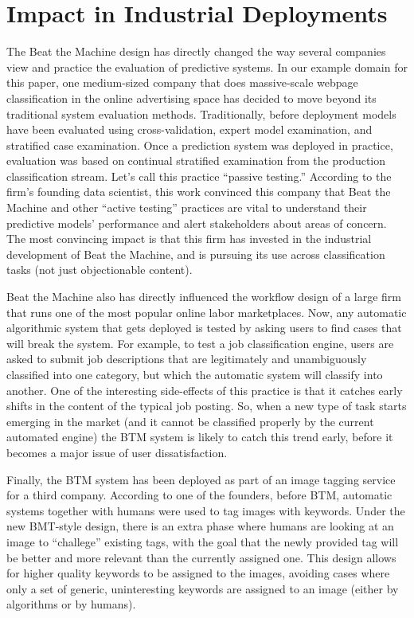 \section{Impact in Industrial Deployments}

The Beat the Machine design has directly changed the way several companies view and practice the evaluation of predictive systems.  In our example domain for this paper, one medium-sized company that does massive-scale webpage classification in the online advertising space has decided to move beyond its traditional system evaluation methods.  Traditionally, before deployment models have been evaluated using cross-validation, expert model examination, and stratified case examination.  Once a prediction system was deployed in practice, evaluation was based on continual stratified examination from the production classification stream.  Let's call this practice ``passive testing.'' 
According to the firm's founding data scientist, this work convinced this company that Beat the Machine and other ``active testing'' practices are vital to understand their predictive models' performance and alert stakeholders about areas of concern.  The most convincing impact is that this firm has invested in the industrial development of Beat the Machine, and is pursuing its use across classification tasks (not just objectionable content). 

Beat the Machine also has directly influenced the workflow design of a large firm that runs one of the most popular online labor marketplaces. Now, any automatic algorithmic system that gets deployed is tested by asking users to find cases that will break the system. For example, to test a job classification engine, users are asked to submit job descriptions that are legitimately and unambiguously classified into one category, but which the automatic system will classify into another. One of the interesting side-effects of this practice is that it catches early shifts in the content of the typical job posting.  So, when a new type of task starts emerging in the market (and it cannot be classified properly by the current automated engine) the BTM system is likely to catch this trend early, before it becomes a major issue of user dissatisfaction.

Finally, the BTM system has been deployed as part of an image tagging service for a third company.  According to one of the founders, before BTM, automatic systems together with humans were used to tag images with keywords. Under the new BMT-style design, there is an extra phase where humans are looking at an image to ``challege'' existing tags, with the goal that the newly provided tag will be better and more relevant than the currently assigned one.  This design allows for higher quality keywords to be assigned to the images, avoiding cases where only a set of generic, uninteresting keywords are assigned to an image (either by algorithms or by humans).

